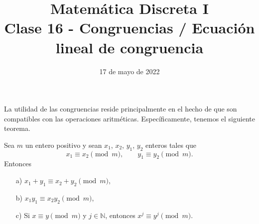 \documentclass[handout]{beamer} %
\title[Clase 16 - Congruencia ]{Matemática Discreta I \\ Clase 16 - Congruencias / Ecuación lineal de congruencia}
\institute[]{\normalsize FAMAF / UNC
    \\[\baselineskip] ${}^{}$
    \\[\baselineskip]
}
\date[17/05/2022]{17 de mayo de 2022}
\begin{document}
    
    \frame{\titlepage} 
    
    
    \begin{frame}
        La utilidad de las congruencias reside principalmente en el hecho
        de que son compatibles con las operaciones aritméticas. \pause
        Específicamente, tenemos el siguiente teorema.
        
        \begin{teorema}\label{t4.1} Sea $m$ un entero positivo y sean $x_1$, $x_2$,
            $y_1$, $y_2$ enteros tales que
            $$
            x_1 \equiv x_2 \pmod{m}, \qquad y_1 \equiv y_2 \pmod{m}.
            $$
            Entonces
            \begin{enumerate}
                \item[a)] $ x_1+ y_1 \equiv x_2+ y_2 \pmod{m}$,
                \item[b)] $x_1 y_1 \equiv x_2 y_2 \pmod{m}$,
                \item[c)] Si $x \equiv y \pmod{m}$  y $j \in  \mathbb N$, entonces $x^j \equiv y^j \pmod{m}$.
            \end{enumerate}
        \end{teorema}
        
    \end{frame}
    
    
    
\end{document}
